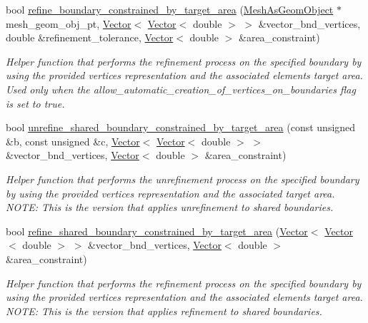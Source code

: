 \begin{DoxyCompactItemize}
bool \hyperlink{classoomph_1_1RefineableTriangleMesh_abd9edf3c6c57a337301abe8828ca0567}{refine\+\_\+boundary\+\_\+constrained\+\_\+by\+\_\+target\+\_\+area} (\hyperlink{classoomph_1_1MeshAsGeomObject}{Mesh\+As\+Geom\+Object} $\ast$mesh\+\_\+geom\+\_\+obj\+\_\+pt, \hyperlink{classoomph_1_1Vector}{Vector}$<$ \hyperlink{classoomph_1_1Vector}{Vector}$<$ double $>$ $>$ \&vector\+\_\+bnd\+\_\+vertices, double \&refinement\+\_\+tolerance, \hyperlink{classoomph_1_1Vector}{Vector}$<$ double $>$ \&area\+\_\+constraint)
\begin{DoxyCompactList}\small\item\em Helper function that performs the refinement process on the specified boundary by using the provided vertices representation and the associated elements target area. Used only when the \textquotesingle{}allow\+\_\+automatic\+\_\+creation\+\_\+of\+\_\+vertices\+\_\+on\+\_\+boundaries\textquotesingle{} flag is set to true. \end{DoxyCompactList}\item 
bool \hyperlink{classoomph_1_1RefineableTriangleMesh_a4631299a76f524bb6bed190836e26bcd}{unrefine\+\_\+shared\+\_\+boundary\+\_\+constrained\+\_\+by\+\_\+target\+\_\+area} (const unsigned \&b, const unsigned \&c, \hyperlink{classoomph_1_1Vector}{Vector}$<$ \hyperlink{classoomph_1_1Vector}{Vector}$<$ double $>$ $>$ \&vector\+\_\+bnd\+\_\+vertices, \hyperlink{classoomph_1_1Vector}{Vector}$<$ double $>$ \&area\+\_\+constraint)
\begin{DoxyCompactList}\small\item\em Helper function that performs the unrefinement process on the specified boundary by using the provided vertices representation and the associated target area. N\+O\+TE\+: This is the version that applies unrefinement to shared boundaries. \end{DoxyCompactList}\item 
bool \hyperlink{classoomph_1_1RefineableTriangleMesh_adf7951948c93e9b0f259a7a05c15f1c5}{refine\+\_\+shared\+\_\+boundary\+\_\+constrained\+\_\+by\+\_\+target\+\_\+area} (\hyperlink{classoomph_1_1Vector}{Vector}$<$ \hyperlink{classoomph_1_1Vector}{Vector}$<$ double $>$ $>$ \&vector\+\_\+bnd\+\_\+vertices, \hyperlink{classoomph_1_1Vector}{Vector}$<$ double $>$ \&area\+\_\+constraint)
\begin{DoxyCompactList}\small\item\em Helper function that performs the refinement process on the specified boundary by using the provided vertices representation and the associated elements target area. N\+O\+TE\+: This is the version that applies refinement to shared boundaries. \end{DoxyCompactList}\item 

\end{DoxyCompactItemize}
